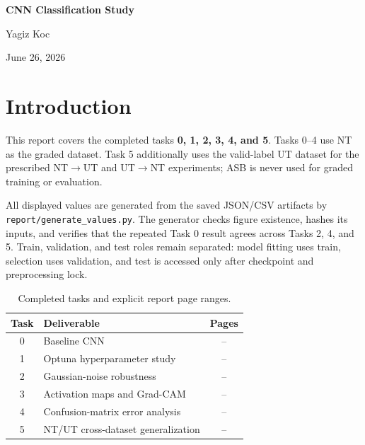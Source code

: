 \documentclass[10pt,a4paper]{article}
\begin{document}
\begin{center}
  {\LARGE\bfseries CNN Classification Study\par}
  \vspace{2mm}
  {\large Yagiz Koc\par}
  \vspace{1mm}
  {\large June 26, 2026\par}
\end{center}

\section*{Introduction}

This report covers the completed tasks \textbf{0, 1, 2, 3, 4, and 5}. Tasks 0--4 use
NT as the graded dataset. Task 5 additionally uses the valid-label UT dataset for the prescribed NT$\rightarrow$UT and UT$\rightarrow$NT experiments; ASB is never used for graded training or evaluation.

All displayed values are generated from the saved JSON/CSV artifacts by
\nolinkurl{report/generate_values.py}. The generator checks figure existence, hashes its
inputs, and verifies that the repeated Task 0 result agrees across Tasks 2, 4, and 5.
Train, validation, and test roles remain separated: model fitting uses train, selection uses
validation, and test is accessed only after checkpoint and preprocessing lock.

\vspace{1cm}

\begin{table}[h]
\centering
\small
\caption{Completed tasks and explicit report page ranges.}
\label{tab:task-pages}
\begin{tabular}{clc}
\toprule
Task & Deliverable & Pages \\
\midrule
0 & Baseline CNN & \pageref{task:0:start}--\pageref{task:0:end} \\
1 & Optuna hyperparameter study & \pageref{task:1:start}--\pageref{task:1:end} \\
2 & Gaussian-noise robustness & \pageref{task:2:start}--\pageref{task:2:end} \\
3 & Activation maps and Grad-CAM & \pageref{task:3:start}--\pageref{task:3:end} \\
4 & Confusion-matrix error analysis & \pageref{task:4:start}--\pageref{task:4:end} \\
5 & NT/UT cross-dataset generalization & \pageref{task:5:start}--\pageref{task:5:end} \\
\bottomrule
\end{tabular}
\end{table}
\end{document}
